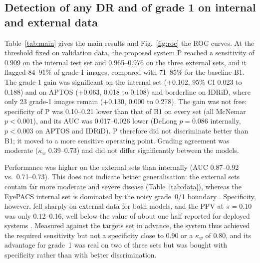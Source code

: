 \subsection{Detection of any DR and of grade 1 on internal and external data}
Table~\ref{tab:main} gives the main results and Fig.~\ref{fig:roc} the ROC curves. At the threshold fixed on validation data, the proposed system P reached a sensitivity of 0.909 on the internal test set and 0.965--0.976 on the three external sets, and it flagged 84--91\% of grade-1 images, compared with 71--85\% for the baseline B1. The grade-1 gain was significant on the internal set (+0.102, 95\% CI 0.023 to 0.188) and on APTOS (+0.063, 0.018 to 0.108) and borderline on IDRiD, where only 23 grade-1 images remain (+0.130, 0.000 to 0.278). The gain was not free: specificity of P was 0.10--0.21 lower than that of B1 on every set (all McNemar $p<0.001$), and its AUC was 0.017--0.026 lower (DeLong $p=0.086$ internally, $p<0.003$ on APTOS and IDRiD). P therefore did not discriminate better than B1; it moved to a more sensitive operating point. Grading agreement was moderate ($\kappa_w$ 0.39--0.73) and did not differ significantly between the models.

Performance was higher on the external sets than internally (AUC 0.87--0.92 vs.\ 0.71--0.73). This does not indicate better generalisation: the external sets contain far more moderate and severe disease (Table~\ref{tab:data}), whereas the EyePACS internal set is dominated by the noisy grade~0/1 boundary \cite{krause2018}. Specificity, however, fell sharply on external data for both models, and the PPV at $\pi=0.10$ was only 0.12--0.16, well below the value of about one half reported for deployed systems \cite{wewetzer2021}. Measured against the targets set in advance, the system thus achieved the required sensitivity but not a specificity close to 0.90 or a $\kappa_w$ of 0.80, and its advantage for grade~1 was real on two of three sets but was bought with specificity rather than with better discrimination.

